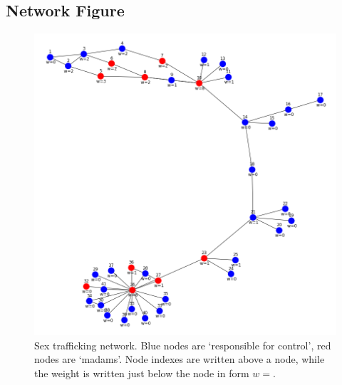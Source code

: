 \documentclass[11p]{article}
\theoremstyle{definition}
\theoremstyle{definition}
\theoremstyle{theorm}
\begin{document}


\newpage
\begin{appendices}
\section{Network Figure}   
\begin{figure}[ht]
\centering
    \includegraphics[angle=0,scale=0.5]{network.png}%
    \caption{Sex trafficking network. Blue nodes are `responsible for control', red nodes are `madams'. Node indexes are written above a node, while the weight is written just below the node in form $w=$.}
    \label{fig:PropProf}
\end{figure}
\end{appendices}
\end{document}
